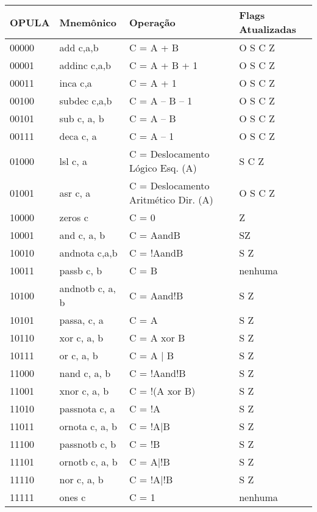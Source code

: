 \documentclass{report}
\begin{document}
   \FloatBarrier
    \begin{table}[H]
      \begin{center}
        \begin{tabular}[pos]{|m{}|m{}|m{4cm}|m{4cm}|} 
          \hline
          \cellcolor[gray]{0.9}\textbf{OPULA} & 
          \cellcolor[gray]{0.9}\textbf{Mnemônico} &
          \cellcolor[gray]{0.9}\textbf{Operação} &
          \cellcolor[gray]{0.9}\textbf{Flags Atualizadas} \\ \hline
            00000 & add c,a,b & C = A + B & O S C Z \\ \hline
            00001 & addinc c,a,b & C = A + B + 1 & O S C Z \\ \hline
            00011 & inca c,a & C = A + 1 & O S C Z \\ \hline
            00100 & subdec c,a,b & C = A – B – 1 & O S C Z \\ \hline
            00101 & sub c, a, b & C = A – B & O S C Z \\ \hline
            00111 & deca c, a & C = A – 1 & O S C Z \\ \hline
            01000 & lsl c, a &  C = Deslocamento Lógico Esq. (A) & S C Z \\ \hline
            01001 & asr c, a & C = Deslocamento Aritmético Dir. (A) & O S C Z \\ \hline
            10000 & zeros c & C = 0 & Z \\ \hline
            10001 & and c, a, b & C = AandB & SZ \\ \hline
            10010 & andnota c,a,b & C = !AandB & S Z \\ \hline
            10011 & passb c, b & C = B & nenhuma \\ \hline
            10100 & andnotb c, a, b & C = Aand!B & S Z \\ \hline
            10101 & passa, c, a & C = A & S Z \\ \hline
            10110 & xor c, a, b & C = A xor B & S Z \\ \hline
            10111 & or c, a, b & C = A | B & S Z \\ \hline
            11000 & nand c, a, b & C = !Aand!B &  S Z \\ \hline
            11001 & xnor c, a, b & C = !(A xor B) &  S Z \\ \hline
            11010 & passnota c, a & C = !A &  S Z \\ \hline
            11011 & ornota c, a, b & C = !A|B &  S Z \\ \hline
            11100 & passnotb c, b & C = !B &  S Z \\ \hline
            11101 & ornotb c, a, b & C = A|!B &  S Z \\ \hline
            11110 & nor c, a, b & C = !A|!B &  S Z \\ \hline
            11111 & ones c & C = 1 &  nenhuma \\ \hline
        \end{tabular}
      \end{center}
    \end{table}  
\end{document}
